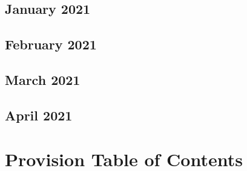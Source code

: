 \documentclass{article}
\begin{document}
	\subsection{January 2021}
	
	\subsection{February 2021}
	
	\subsection{March 2021}
	
	\subsection{April 2021}
	\section{Provision Table of Contents}
\end{document}
